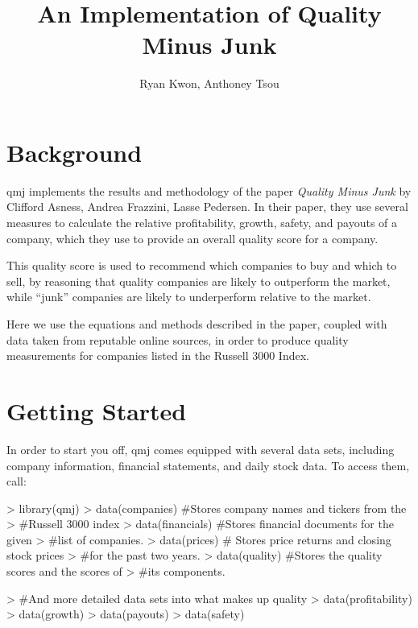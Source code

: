 \documentclass[titlepage]{article}
\author{Ryan Kwon, Anthoney Tsou}
\title{An Implementation of Quality Minus Junk}
\begin{document}

\maketitle

\section*{Background}
qmj implements the results and methodology of the paper \emph{Quality Minus Junk} by Clifford Asness, Andrea Frazzini, Lasse Pedersen. In their paper, they use several measures to calculate the relative profitability, growth, safety, and payouts of a company, which they use to provide an overall quality score for a company.

This quality score is used to recommend which companies to buy and which to sell, by reasoning that quality companies are likely to outperform the market, while ``junk'' companies are likely to underperform relative to the market.

Here we use the equations and methods described in the paper, coupled with data taken from reputable online sources, in order to produce quality measurements for companies listed in the Russell 3000 Index.

\section*{Getting Started}
In order to start you off, qmj comes equipped with several data sets, including company information, financial statements, and daily stock data. To access them, call:

\begin{Schunk}
\begin{Sinput}
> library(qmj)
> data(companies) #Stores company names and tickers from the 
> #Russell 3000 index
> data(financials) #Stores financial documents for the given 
> #list of companies.
> data(prices) # Stores price returns and closing stock prices 
> #for the past two years.
> data(quality) #Stores the quality scores and the scores of 
> #its components.
\end{Sinput}
\end{Schunk}
\begin{Schunk}
\begin{Sinput}
> #And more detailed data sets into what makes up quality
> data(profitability)
> data(growth)
> data(payouts)
> data(safety)
\end{Sinput}
\end{Schunk}
\end{document}
